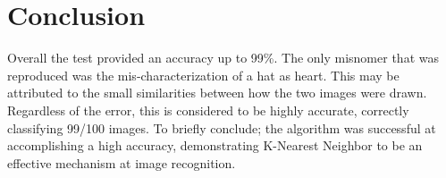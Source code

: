 \documentclass[]{report}
\begin{document}
\section{Conclusion}
{\fontsize{14}{4}\selectfont Overall the test provided an accuracy up to 99\%. The only misnomer that was reproduced was the mis-characterization of a hat as heart. This may be attributed to the small similarities between how the two images were drawn. Regardless of the error, this is considered to be highly accurate, correctly classifying 99/100 images. To briefly conclude; the algorithm was successful at accomplishing a high accuracy, demonstrating K-Nearest Neighbor to be an effective mechanism at image recognition.}
\end{document}
